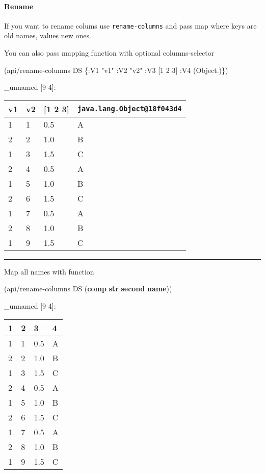 \documentclass[]{article}
\newenvironment{Shaded}{\begin{snugshade}}{\end{snugshade}}
\newcommand{\AttributeTok}[1]{\textcolor[rgb]{0.77,0.63,0.00}{#1}}
\newcommand{\DecValTok}[1]{\textcolor[rgb]{0.00,0.00,0.81}{#1}}
\newcommand{\KeywordTok}[1]{\textcolor[rgb]{0.13,0.29,0.53}{\textbf{#1}}}
\newcommand{\NormalTok}[1]{#1}
\newcommand{\StringTok}[1]{\textcolor[rgb]{0.31,0.60,0.02}{#1}}
\let\oldparagraph\paragraph
\renewcommand{\paragraph}[1]{\oldparagraph{#1}\mbox{}}
\begin{document}
\hypertarget{rename}{%
\paragraph{Rename}\label{rename}}

If you want to rename colums use \texttt{rename-columns} and pass map
where keys are old names, values new ones.

You can also pass mapping function with optional columns-selector

\begin{Shaded}
\begin{Highlighting}[]
\NormalTok{(api/rename-columns DS \{}\AttributeTok{:V1} \StringTok{"v1"}
                        \AttributeTok{:V2} \StringTok{"v2"}
                        \AttributeTok{:V3}\NormalTok{ [}\DecValTok{1} \DecValTok{2} \DecValTok{3}\NormalTok{]}
                        \AttributeTok{:V4}\NormalTok{ (Object.)\})}
\end{Highlighting}
\end{Shaded}

\_unnamed {[}9 4{]}:

\begin{longtable}[]{@{}llll@{}}
\toprule
v1 & v2 & {[}1 2 3{]} &
\href{mailto:java.lang.Object@18f043d4}{\nolinkurl{java.lang.Object@18f043d4}}\tabularnewline
\midrule
\endhead
1 & 1 & 0.5 & A\tabularnewline
2 & 2 & 1.0 & B\tabularnewline
1 & 3 & 1.5 & C\tabularnewline
2 & 4 & 0.5 & A\tabularnewline
1 & 5 & 1.0 & B\tabularnewline
2 & 6 & 1.5 & C\tabularnewline
1 & 7 & 0.5 & A\tabularnewline
2 & 8 & 1.0 & B\tabularnewline
1 & 9 & 1.5 & C\tabularnewline
\bottomrule
\end{longtable}

\begin{center}\rule{0.5\linewidth}{0.5pt}\end{center}

Map all names with function

\begin{Shaded}
\begin{Highlighting}[]
\NormalTok{(api/rename-columns DS (}\KeywordTok{comp} \KeywordTok{str} \KeywordTok{second} \KeywordTok{name}\NormalTok{))}
\end{Highlighting}
\end{Shaded}

\_unnamed {[}9 4{]}:

\begin{longtable}[]{@{}llll@{}}
\toprule
1 & 2 & 3 & 4\tabularnewline
\midrule
\endhead
1 & 1 & 0.5 & A\tabularnewline
2 & 2 & 1.0 & B\tabularnewline
1 & 3 & 1.5 & C\tabularnewline
2 & 4 & 0.5 & A\tabularnewline
1 & 5 & 1.0 & B\tabularnewline
2 & 6 & 1.5 & C\tabularnewline
1 & 7 & 0.5 & A\tabularnewline
2 & 8 & 1.0 & B\tabularnewline
1 & 9 & 1.5 & C\tabularnewline
\bottomrule
\end{longtable}
\end{document}
